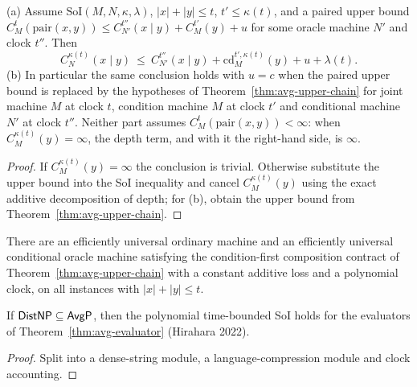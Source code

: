 \begin{theorem}
  \label{thm:avg-soi-cancellation}
  \leanok
  (a) Assume $\mathrm{SoI}(M, N, \kappa, \lambda)$, $|x| + |y| \le t$, $t' \le
  \kappa(t)$, and a paired upper bound
  $C^t_M(\mathrm{pair}(x,y)) \le C^{t''}_{N'}(x \mid y) + C^{t'}_M(y) + u$
  for some oracle machine $N'$ and clock $t''$. Then
  \[
    C^{\kappa(t)}_N(x \mid y) \ \le\ C^{t''}_{N'}(x \mid y) +
      \mathrm{cd}^{t', \kappa(t)}_M(y) + u + \lambda(t).
  \]
  (b) In particular the same conclusion holds with $u = c$ when the paired
  upper bound is replaced by the hypotheses of
  Theorem~\ref{thm:avg-upper-chain} for joint machine $M$ at clock $t$,
  condition machine $M$ at clock $t'$ and conditional machine $N'$ at clock
  $t''$. Neither part assumes $C^t_M(\mathrm{pair}(x,y)) < \infty$: when
  $C^{\kappa(t)}_M(y) = \infty$, the depth term, and with it the right-hand
  side, is $\infty$.
\end{theorem}
\begin{proof}
  \leanok
  If $C^{\kappa(t)}_M(y) = \infty$ the conclusion is trivial. Otherwise
  substitute the upper bound into the SoI inequality and cancel
  $C^{\kappa(t)}_M(y)$ using the exact additive decomposition of depth; for
  (b), obtain the upper bound from Theorem~\ref{thm:avg-upper-chain}.
\end{proof}

\begin{theorem}
  \label{thm:avg-evaluator}
  There are an efficiently universal ordinary machine and an efficiently
  universal conditional oracle machine satisfying the condition-first
  composition contract of Theorem~\ref{thm:avg-upper-chain} with a constant
  additive loss and a polynomial clock, on all instances with $|x| + |y| \le
  t$.
\end{theorem}

\begin{theorem}
  \label{thm:avg-distnp-soi}
  \notready
  If $\mathsf{DistNP} \subseteq \mathsf{AvgP}$, then the polynomial time-bounded SoI
  holds for the evaluators of Theorem~\ref{thm:avg-evaluator} (Hirahara 2022).
\end{theorem}
\begin{proof}
  Split into a dense-string module, a language-compression module and clock
  accounting.
\end{proof}


